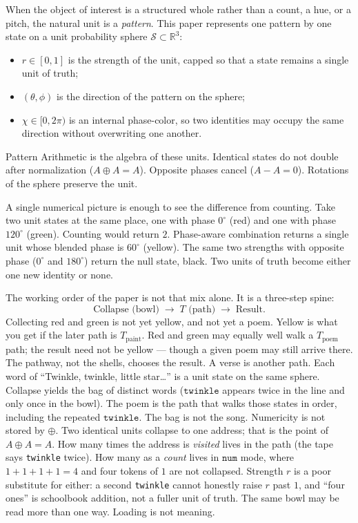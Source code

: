 \documentclass[12pt, a4paper]{article}
\begin{document}
When the object of interest is a structured whole rather than a
count, a hue, or a pitch, the natural unit is a \emph{pattern}.
This paper represents one pattern by one state on a unit
probability sphere $\mathcal{S} \subset \mathbb{R}^3$:
\begin{itemize}
    \item $r \in [0, 1]$ is the strength of the unit, capped so that a state remains a single unit of truth;
    \item $(\theta, \phi)$ is the direction of the pattern on the sphere;
    \item $\chi \in [0, 2\pi)$ is an internal phase-color, so two identities may occupy the same direction without overwriting one another.
\end{itemize}
Pattern Arithmetic is the algebra of these units. Identical states do not double after normalization ($A \oplus A = A$). Opposite phases cancel ($A - A = 0$). Rotations of the sphere preserve the unit.

A single numerical picture is enough to see the difference from counting. Take two unit states at the same place, one with phase $0^\circ$ (red) and one with phase $120^\circ$ (green). Counting would return $2$. Phase-aware combination returns a single unit whose blended phase is $60^\circ$ (yellow). The same two strengths with opposite phase ($0^\circ$ and $180^\circ$) return the null state, black. Two units of truth become either one new identity or none.

The working order of the paper is not that mix alone. It is a three-step spine:
\[
\text{Collapse (bowl)} \;\longrightarrow\; T\text{ (path)} \;\longrightarrow\; \text{Result}.
\]
Collecting red and green is not yet yellow, and not yet a poem.
Yellow is what you get if the later path is $T_{\mathrm{paint}}$.
Red and green may equally well walk a $T_{\mathrm{poem}}$ path; the
result need not be yellow --- though a given poem may still arrive
there. The pathway, not the shells, chooses the result. A verse is
another path.
Each word of ``Twinkle, twinkle, little star\ldots'' is a unit state
on the same sphere. Collapse yields the bag of distinct words
($\texttt{twinkle}$ appears twice in the line and only once in the
bowl). The poem is the path that walks those states in order,
including the repeated $\texttt{twinkle}$. The bag is not the song.
Numericity is not stored by $\oplus$. Two identical units collapse
to one address; that is the point of $A\oplus A=A$. How many times
the address is \emph{visited} lives in the path (the tape says
\texttt{twinkle} twice). How many as a \emph{count} lives in
$\mathtt{num}$ mode, where $1+1+1+1=4$ and four tokens of $1$ are
not collapsed. Strength $r$ is a poor substitute for either: a
second \texttt{twinkle} cannot honestly raise $r$ past $1$, and
``four ones'' is schoolbook addition, not a fuller unit of truth.
The same bowl may be read more than one way. Loading is not meaning.
\end{document}
